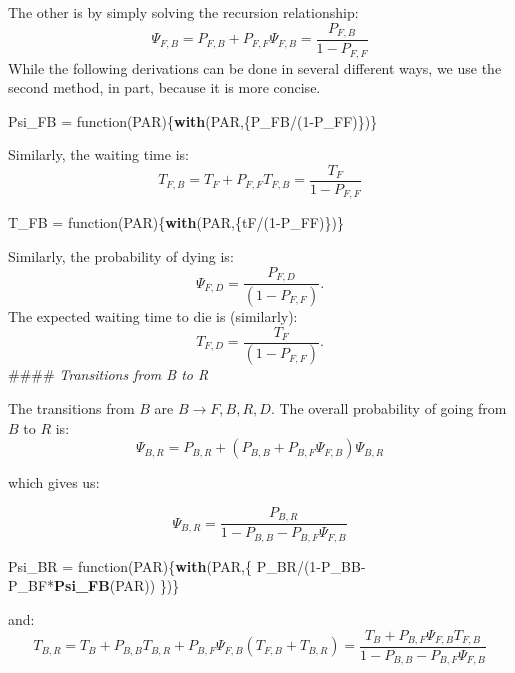 \documentclass[]{article}
\newenvironment{Shaded}{\begin{snugshade}}{\end{snugshade}}
\newcommand{\KeywordTok}[1]{\textcolor[rgb]{0.13,0.29,0.53}{\textbf{{#1}}}}
\newcommand{\DecValTok}[1]{\textcolor[rgb]{0.00,0.00,0.81}{{#1}}}
\newcommand{\StringTok}[1]{\textcolor[rgb]{0.31,0.60,0.02}{{#1}}}
\newcommand{\NormalTok}[1]{{#1}}
\begin{document}
The other is by simply solving the recursion relationship:
\[\Psi_{F,B} = P_{F,B} + P_{F,F} \Psi_{F,B} = \frac{P_{F,B}}{1-P_{F,F}}\]
While the following derivations can be done in several different ways,
we use the second method, in part, because it is more concise.

\begin{Shaded}
\begin{Highlighting}[]
\NormalTok{Psi_FB =}\StringTok{ }\NormalTok{function(PAR)\{}\KeywordTok{with}\NormalTok{(PAR,\{P_FB/(}\DecValTok{1}\NormalTok{-P_FF)\})\} }
\end{Highlighting}
\end{Shaded}

Similarly, the waiting time is:
\[T_{F,B} =  T_F + P_{F,F} T_{F,B} = \frac{T_F}{1-P_{F,F}}\]

\begin{Shaded}
\begin{Highlighting}[]
\NormalTok{T_FB =}\StringTok{ }\NormalTok{function(PAR)\{}\KeywordTok{with}\NormalTok{(PAR,\{tF/(}\DecValTok{1}\NormalTok{-P_FF)\})\}}
\end{Highlighting}
\end{Shaded}

Similarly, the probability of dying is:
\[\Psi_{F,D} = \frac{P_{F,D}}{(1-P_{F,F})}.\] The expected waiting time
to die is (similarly): \[T_{F,D} = \frac{T_F}{(1-P_{F,F})}.\] \#\#\#\#
\emph{Transitions from B to R}

The transitions from \(B\) are \(B\rightarrow {F,B,R,D}\). The overall
probability of going from \(B\) to \(R\) is:
\[\Psi_{B,R} = P_{B,R} + \left(P_{B,B} + P_{B,F} \Psi_{F,B} \right) \Psi_{B,R}\]

which gives us:

\[ \Psi_{B,R} = \frac{P_{B,R}}{1-P_{B,B} - P_{B,F} \Psi_{F,B}} \]

\begin{Shaded}
\begin{Highlighting}[]
\NormalTok{Psi_BR =}\StringTok{ }\NormalTok{function(PAR)\{}\KeywordTok{with}\NormalTok{(PAR,\{}
  \NormalTok{P_BR/(}\DecValTok{1}\NormalTok{-P_BB-P_BF*}\KeywordTok{Psi_FB}\NormalTok{(PAR))}
\NormalTok{\})\}}
\end{Highlighting}
\end{Shaded}

and: \[ 
T_{B,R} = T_B + P_{B,B} T_{B,R} + P_{B,F} \Psi_{F,B} \left(T_{F,B} +  T_{B,R} \right) =  \frac{T_B +  P_{B,F} \Psi_{F,B} T_{F,B}}{1-P_{B,B} - P_{B,F} \Psi_{F,B}}
\]
\end{document}
